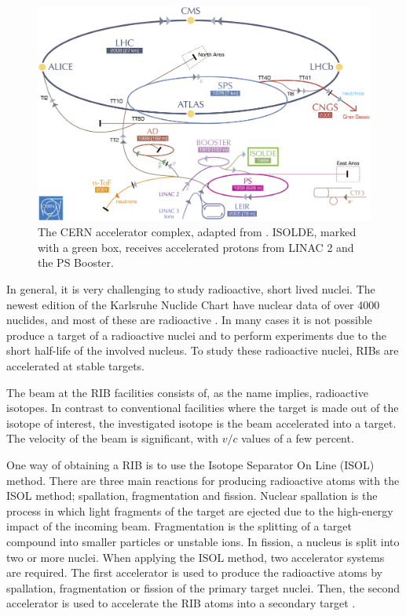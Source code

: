 \documentclass[twoside,english]{uiofysmaster/uiofysmaster}
\begin{document}
\begin{figure}[ht]
	\centering
	\includegraphics[width=\textwidth]{Images/CERN-accelerators.png}
	\caption{The CERN accelerator complex, adapted from \cite{CERN-AC}. ISOLDE, marked with a green box, receives accelerated protons from LINAC 2 and the PS Booster.}
	\label{fig:accelerators}
\end{figure}

In general, it is very challenging to study radioactive, short lived nuclei. 
The newest edition of the Karlsruhe Nuclide Chart have nuclear data of over 4000 nuclides, and most of these are radioactive \cite{CoN}. 
In many cases it is not possible produce a target of a radioactive nuclei and to perform experiments due to the short half-life of the involved nucleus. 
To study these radioactive nuclei, RIBs are accelerated at stable targets. 

The beam at the RIB facilities consists of, as the name implies, radioactive isotopes. 
In contrast to conventional facilities where the target is made out of the isotope of interest, the investigated isotope is the beam accelerated into a target.
The velocity of the beam is significant, with $v/c$ values of a few percent. 

One way of obtaining a RIB is to use the Isotope Separator On Line (ISOL) method. 
There are three main reactions for producing radioactive atoms with the ISOL method; spallation, fragmentation and fission. 
Nuclear spallation is the process in which light fragments of the target are ejected due to the high-energy impact of the incoming beam. 
Fragmentation is the splitting of a target compound into smaller particles or unstable ions. 
In fission, a nucleus is split into two or more nuclei.
When applying the ISOL method, two accelerator systems are required. 
The first accelerator is used to produce the radioactive atoms by spallation, fragmentation or fission of the primary target nuclei. 
Then, the second accelerator is used to accelerate the RIB atoms into a secondary target \cite{ISOLDE-web, Lindroos, ISOL}. 
\end{document}
